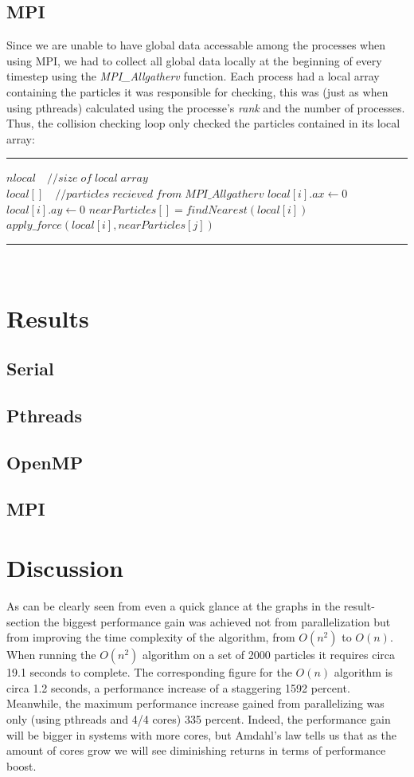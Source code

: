 \documentclass[11pt,a4paper]{article}
\begin{document}
\subsection{MPI}
Since we are unable to have global data accessable among the processes when using MPI, we had to collect all global data locally at the beginning of every timestep using the \emph{MPI\_Allgatherv} function. Each process had a local array containing the particles it was responsible for checking, this was (just as when using pthreads) calculated using the processe's \emph{rank} and the number of processes. Thus, the collision checking loop only checked the particles contained in its local array:
\\
\rule{125mm}{0.1pt}
\begin{algorithmic}
\STATE $nlocal\quad //size\;of\;local\;array$
\STATE $local[]\quad //particles\;recieved\;from\;MPI\_Allgatherv$
	\STATE $local[i].ax \gets 0$
	\STATE $local[i].ay \gets 0$
	\STATE $nearParticles[] = findNearest(local[i])$
			\STATE $apply\_force(local[i],nearParticles[j])$
	\ENDFOR
\ENDFOR 
\end{algorithmic}
\rule{125mm}{0.1pt}
\vspace{10pt}
\\
\section{Results}
\subsection{Serial}
\subsection{Pthreads}
\subsection{OpenMP}
\subsection{MPI}
\section{Discussion}
As can be clearly seen from even a quick glance at the graphs in the result-section the biggest performance gain was achieved not from parallelization but from improving the time complexity of the algorithm, from $O(n^{2})$ to $O(n)$. When running the $O(n^{2})$ algorithm on a set of 2000 particles it requires circa 19.1 seconds to complete. The corresponding figure for the $O(n)$ algorithm is circa 1.2 seconds, a performance increase of a staggering 1592 percent. Meanwhile, the maximum performance increase gained from parallelizing was only (using pthreads and 4/4 cores) 335 percent. Indeed, the performance gain will be bigger in systems with more cores, but Amdahl's law tells us that as the amount of cores grow we will see diminishing returns in terms of performance boost.
\end{document}
